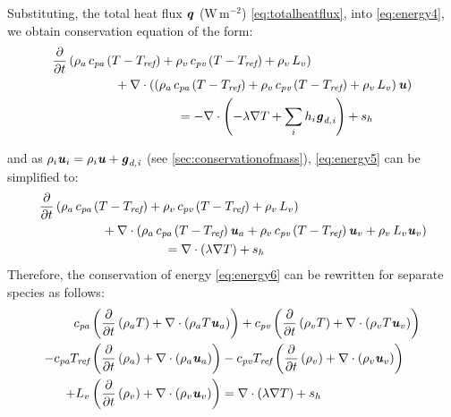 Substituting, the total heat flux $\textbf{\textit{q}}$ (W\,m$^{-2}$) \cref{eq:totalheatflux}, into \cref{eq:energy4}, we obtain conservation equation of the form:
\begin{equation}
\begin{split}
&\frac{\partial }{\partial t} \left( \rho_a\,c_{\textit{pa}}\left(T - T_{\textit{ref}}\right) +  \rho_v\,c_{\textit{pv}} \left(T - T_{\textit{ref}}\right) + \rho_v\, L_v \right)\\
& \hspace{5em} + \nabla  \cdot \left( \left( \rho_a\,c_{\textit{pa}}\left(T - T_{\textit{ref}}\right) +  \rho_v\,c_{\textit{pv}} \left(T - T_{\textit{ref}}\right) + \rho_v\, L_v \right) \mvec{u}\right)\\
& \hspace{10em} =  - \nabla  \cdot \left(- \lambda \nabla T + \sum_i h_i \mvec{g}_{\textit{d,i}}\right) + s_h
\end{split}
\label{eq:energy5}
\end{equation}

and as $\rho_i\textbf{\textit{u}}_i = \rho_i \textbf{\textit{u}} + \textbf{\textit{g}}_{\textit{d,i}}$ (see \cref{sec:conservationofmass}), \cref{eq:energy5} can be simplified to:
\begin{equation}
\begin{split}
&\frac{\partial }{\partial t} \left( \rho_a\,c_{\textit{pa}}\left(T - T_{\textit{ref}}\right) +  \rho_v\,c_{\textit{pv}} \left(T - T_{\textit{ref}}\right) + \rho_v\, L_v \right)\\
& \hspace{5em} + \nabla  \cdot \left( \rho_a\,c_{\textit{pa}}\left(T - T_{\textit{ref}}\right)\mvec{u}_a +  \rho_v\,c_{\textit{pv}} \left(T - T_{\textit{ref}}\right)\mvec{u}_v + \rho_v\, L_v\mvec{u}_v \right)\\
& \hspace{10em} =  \nabla  \cdot \left(\lambda \nabla T \right) + s_h
\end{split}
\label{eq:energy6}
\end{equation}
Therefore, the conservation of energy \cref{eq:energy6} can be rewritten for separate species as follows:
\begin{equation}
\begin{split}
c_{\textit{pa}}  &\left( \frac{\partial }{\partial t} \left( \rho_a T \right) + \nabla\cdot \left(\rho_a T \textbf{\textit{u}}_a \right)  \right) + c_{\textit{pv}} \left( \frac{\partial }{\partial t} \left( \rho_v T \right) + \nabla \cdot\left(\rho_v T \textbf{\textit{u}}_v \right)  \right) \\ 
- c_{\textit{pa}} T_{\textit{ref}} &\left( \frac{\partial }{\partial t} \left( \rho_a \right) + \nabla\cdot \left(\rho_a \textbf{\textit{u}}_a \right)  \right) - c_{\textit{pv}} T_{\textit{ref}} \left( \frac{\partial }{\partial t} \left( \rho_v \right) + \nabla\cdot \left(\rho_v \textbf{\textit{u}}_v \right)  \right) \\
 + L_v &\left( \frac{\partial }{\partial t} \left( \rho_v \right) + \nabla\cdot \left(\rho_v \textbf{\textit{u}}_v \right)  \right) =  \nabla  \cdot \left(\lambda \nabla T \right) + s_h
\end{split}
\label{eq:energy7}
\end{equation}

